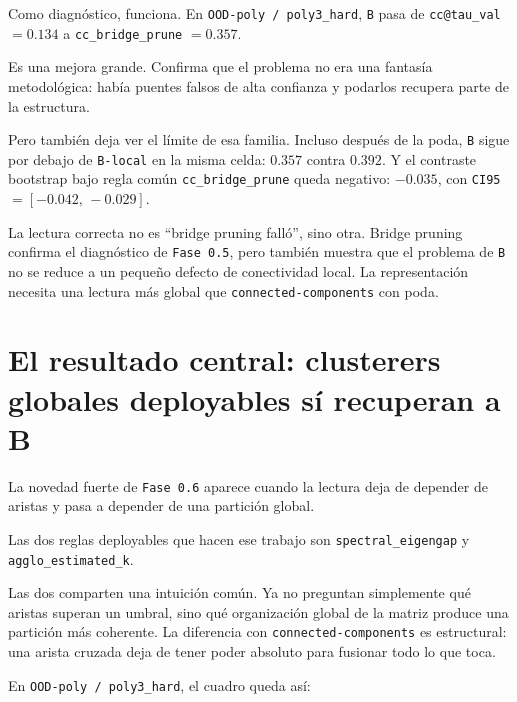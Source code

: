 \documentclass[11pt]{article}
\begin{document}
Como diagnóstico, funciona. En \texttt{OOD-poly / poly3\_hard}, \texttt{B} pasa de \texttt{cc@tau\_val} $=0.134$ a \texttt{cc\_bridge\_prune} $=0.357$.

Es una mejora grande. Confirma que el problema no era una fantasía metodológica: había puentes falsos de alta confianza y podarlos recupera parte de la estructura.

Pero también deja ver el límite de esa familia. Incluso después de la poda, \texttt{B} sigue por debajo de \texttt{B-local} en la misma celda: $0.357$ contra $0.392$. Y el contraste bootstrap bajo regla común \texttt{cc\_bridge\_prune} queda negativo: $-0.035$, con \texttt{CI95} $=[-0.042,\,-0.029]$.

La lectura correcta no es ``bridge pruning falló'', sino otra. Bridge pruning confirma el diagnóstico de \texttt{Fase 0.5}, pero también muestra que el problema de \texttt{B} no se reduce a un pequeño defecto de conectividad local. La representación necesita una lectura más global que \texttt{connected-components} con poda.

\section{El resultado central: clusterers globales deployables sí recuperan a B}

La novedad fuerte de \texttt{Fase 0.6} aparece cuando la lectura deja de depender de aristas y pasa a depender de una partición global.

Las dos reglas deployables que hacen ese trabajo son \texttt{spectral\_eigengap} y \texttt{agglo\_estimated\_k}.

Las dos comparten una intuición común. Ya no preguntan simplemente qué aristas superan un umbral, sino qué organización global de la matriz produce una partición más coherente. La diferencia con \texttt{connected-components} es estructural: una arista cruzada deja de tener poder absoluto para fusionar todo lo que toca.

En \texttt{OOD-poly / poly3\_hard}, el cuadro queda así:
\end{document}
